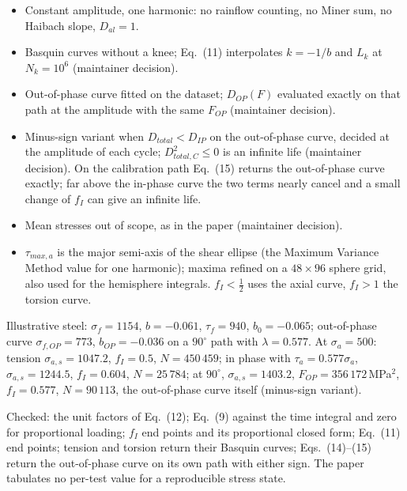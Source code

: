 \begin{itemize}
\item Constant amplitude, one harmonic: no rainflow counting, no Miner sum, no Haibach slope,
  $D_{al}=1$.
\item Basquin curves without a knee; Eq.~(11) interpolates $k=-1/b$ and $L_k$ at $N_k=10^6$
  (maintainer decision).
\item Out-of-phase curve fitted on the dataset; $D_{OP}(F)$ evaluated exactly on that path at the
  amplitude with the same $F_{OP}$ (maintainer decision).
\item Minus-sign variant when $D_{total}<D_{IP}$ on the out-of-phase curve, decided at the
  amplitude of each cycle; $D_{total,C}^2\le0$ is an infinite life (maintainer decision). On the
  calibration path Eq.~(15) returns the out-of-phase curve exactly; far above the in-phase curve
  the two terms nearly cancel and a small change of $f_I$ can give an infinite life.
\item Mean stresses out of scope, as in the paper (maintainer decision).
\item $\tau_{max,a}$ is the major semi-axis of the shear ellipse (the Maximum Variance Method
  value for one harmonic); maxima refined on a $48\times96$ sphere grid, also used for the
  hemisphere integrals. $f_I<\tfrac12$ uses the axial curve, $f_I>1$ the torsion curve.
\end{itemize}

 Illustrative steel: $\sigma_f=1154$\MPa, $b=-0.061$, $\tau_f=940$\MPa,
$b_0=-0.065$; out-of-phase curve $\sigma_{f,OP}=773$\MPa, $b_{OP}=-0.036$ on a $90^\circ$ path with
$\lambda=0.577$. At $\sigma_a=500$\MPa: tension $\sigma_{a,s}=1047.2$\MPa, $f_I=0.5$,
$N=450\,459$; in phase with $\tau_a=0.577\sigma_a$, $\sigma_{a,s}=1244.5$\MPa, $f_I=0.604$,
$N=25\,784$; at $90^\circ$, $\sigma_{a,s}=1403.2$\MPa, $F_{OP}=356\,172$\,MPa$^2$, $f_I=0.577$,
$N=90\,113$, the out-of-phase curve itself (minus-sign variant).

 Checked: the unit factors of Eq.~(12); Eq.~(9) against the time integral and
zero for proportional loading; $f_I$ end points and its proportional closed form; Eq.~(11) end
points; tension and torsion return their Basquin curves; Eqs.~(14)--(15) return the out-of-phase
curve on its own path with either sign. The paper tabulates no per-test value for a reproducible
stress state.
